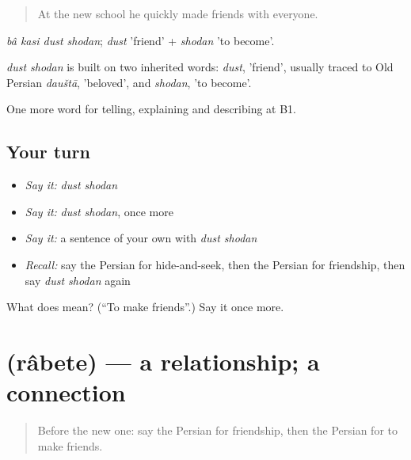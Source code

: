 \begin{quote}
At the new school he quickly made friends with everyone.
\end{quote}

\emph{bâ kasi dust shodan}; \emph{dust} 'friend' + \emph{shodan} 'to become'.

\begin{cousinweb}
\emph{dust shodan} is built on two inherited words: \emph{dust}, 'friend', usually traced to Old Persian \emph{dauštā}, 'beloved', and \emph{shodan}, 'to become'.
\end{cousinweb}

\begin{grammarlens}[title={What you've built}]
One more word for telling, explaining and describing at B1.
\end{grammarlens}

\subsection*{Your turn}
\begin{itemize}
\raggedright
  \item \emph{Say it:} \emph{dust shodan}
  \item \emph{Say it:} \emph{dust shodan}, once more
  \item \emph{Say it:} a sentence of your own with \emph{dust shodan}
  \item \emph{Recall:} say the Persian for hide-and-seek, then the Persian for friendship, then say \emph{dust shodan} again
\end{itemize}

\begin{tcolorbox}[breakable,colback=teal!4,colframe=teal!35!black,title={Before you move on}]
What does   mean? (\textquotedblleft{}To make friends\textquotedblright{}.) Say it once more.
\end{tcolorbox}
\section[\texorpdfstring{\fa{رابطه} (râbete)}{رابطه (râbete)}]{ (râbete) — a relationship; a connection}

\label{lesson:FA-C504-rabete}



\begin{quote}
Before the new one: say the Persian for friendship, then the Persian for to make friends.
\end{quote}

